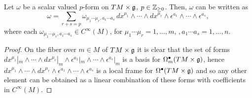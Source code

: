 \begin{proposition}\label{propositionDecompOfScalarValuedFormsTLA}
Let $\omega$ be a scalar valued $p$-form on $TM \times \mathfrak{g}$, $p \in \mathbb{Z}_{\geq 0}$. Then, $\omega$ can be written as
\begin{equation}
    \omega = \sum_{r + s = p} \omega_{\mu_1 \cdots \mu_r, a_1 \cdots a_s}\, dx^{\mu_1} \wedge \cdots \wedge dx^{\mu_r} \wedge \epsilon^{a_1} \wedge \cdots \wedge \epsilon^{a_s},
\end{equation}
where each $\omega_{\mu_1 \cdots \mu_r, a_1 \cdots a_s} \in C^\infty(M)$, for $\mu_1 \cdots \mu_r = 1, \dots, m$, $, a_1 \cdots a_s = 1, \dots, n$.
\end{proposition}
\begin{proof}
On the fiber over $m \in M$ of $TM \times \mathfrak{g}$ it is clear that the set of forms $dx^{\mu_1}|_m \wedge \cdots \wedge dx^{\mu_r}|_m \wedge \epsilon^{a_1}|_m \wedge \cdots \wedge \epsilon^{a_s}|_m$ is a basis for $\Omega_m^\bullet(TM \times \mathfrak{g})$, hence $dx^{\mu_1} \wedge \cdots \wedge dx^{\mu_r} \wedge \epsilon^{a_1} \wedge \cdots \wedge \epsilon^{a_s}$ is a local frame for $\Omega^\bullet(TM \times \mathfrak{g})$ and so any other element can be obtained as a linear combination of these forms with coefficients in $C^\infty(M)$.
\end{proof}



